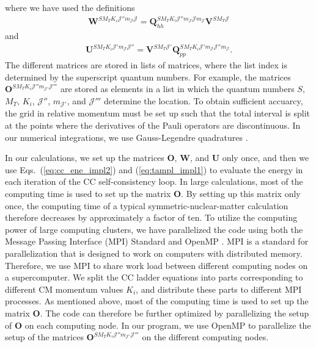 \documentclass[a4paper,12pt]{report}
\begin{document}
where we have used the definitions
\begin{align}
  \mathbf{W}^{SM_{T}K_{i}\mathcal{J}''m_{\mathcal{J}}\mathcal{J}}
  = \mathbf{Q}_{hh}^{SM_{T}K_{i}\mathcal{J}''m_{\mathcal{J}}
    \mathcal{J}m_{\mathcal{J}}}
  \mathbf{V}^{SM_{T}\mathcal{J}}
\end{align}
and 
\begin{align}
  \mathbf{U}^{SM_{T}K_{i}\mathcal{J}'m_{\mathcal{J}}\mathcal{J}''}
  = \mathbf{V}^{SM_{T}\mathcal{J}'}
  \mathbf{Q}_{pp}^{SM_{T}K_{i}\mathcal{J}'m_{\mathcal{J}}
  \mathcal{J}''m_{\mathcal{J}}}.
\end{align}
The different matrices are stored in lists of matrices,
where the list index is determined by the superscript 
quantum numbers. For example, the matrices 
$\mathbf{O}^{SM_{T}K_{i}\mathcal{J}''m_{\mathcal{J}'}\mathcal{J}'''} $ 
are stored as elements in a list in which the quantum 
numbers $S$, $M_{T}$, $K_{i}$, $\mathcal{J}''$, 
$m_{\mathcal{J}'}$, and $\mathcal{J}'''$ determine the
location. To obtain sufficient accuarcy, the grid in 
relative momentum must be set up such that the total
interval is split at the points where the derivatives
of the Pauli operators are discontinuous. In our numerical
integrations, we use Gauss-Legendre quadratures 
\cite{num_recipes}. 

In our calculations, we set up the matrices 
$\mathbf{O}$, $\mathbf{W}$, and $\mathbf{U}$ only once, 
and then we use Eqs.~(\ref{eq:cc_ene_impl2}) 
and (\ref{eq:tampl_impl1}) to evaluate the energy in 
each iteration of the CC self-consistency loop. 
In large calculations, most of the computing time is 
used to set up the matrix $\mathbf{O}$. 
By setting up this matrix only once, the computing 
time of a typical symmetric-nuclear-matter calculation 
therefore decreases by approximately a factor of ten. 
To utilize the computing power of large computing clusters,
we have parallelized the code using both the 
Message Passing Interface (MPI) Standard 
\cite{gropp1999,traff2012} and OpenMP \cite{chapman}.
MPI is a standard for parallelization that is designed
to work on computers with distributed memory. Therefore, 
we use MPI to share work load between different computing
nodes on a supercomputer. We split the CC ladder 
equations into parts corresponding to different CM 
momentum values $K_{i}$, and distribute these parts
to different MPI processes. As mentioned above, most
of the computing time is used to set up the matrix
$\mathbf{O}$. The code can therefore be further
optimized by parallelizing the setup of $\mathbf{O}$
on each computing node. In our program, we use OpenMP 
to parallelize the setup of the matrices
$\mathbf{O}^{SM_{T}K_{i}\mathcal{J}''m_{\mathcal{J}'}\mathcal{J}'''} $ 
on the different computing nodes. 
\end{document}
